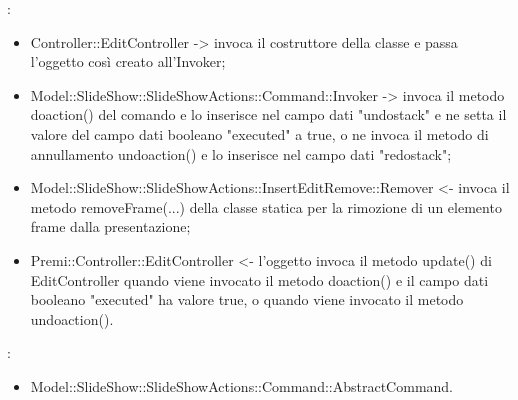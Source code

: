 {{				\textbf{\relaz}: 
				\begin{itemize}
					\item Controller::\-EditController -> invoca il costruttore della classe e passa l’oggetto così creato all’Invoker;
					\item Model::\-SlideShow::\-SlideShowActions::\-Command::\-Invoker -> invoca il metodo doaction() del comando e lo inserisce nel campo dati "undostack" e ne setta il valore del campo dati booleano "executed" a true, o ne invoca il metodo di annullamento undoaction() e lo inserisce nel campo dati "redostack";
                    \item Model::\-SlideShow::\-SlideShowActions::\-InsertEditRemove::\-Remover <- invoca il metodo removeFrame(...) della classe statica per la rimozione di un elemento frame dalla presentazione;
                    \item Premi::\-Controller::\-EditController <- l'oggetto invoca il metodo update() di EditController quando viene invocato il metodo doaction() e il campo dati booleano "executed" ha valore true, o quando viene invocato il metodo undoaction().
				\end{itemize}	
                \textbf{\base}: 
                    \begin{itemize}
                    \item Model::\-SlideShow::\-SlideShowActions::\-Command::\-AbstractCommand.
                    \end{itemize}
                    }                   
                    }
